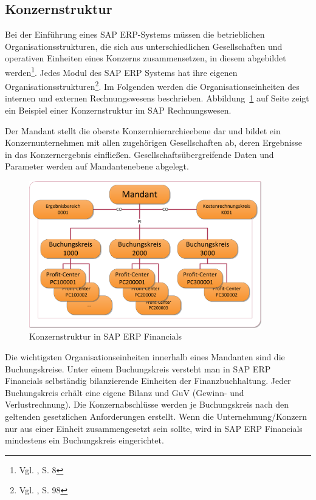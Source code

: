 \subsection{Konzernstruktur}
Bei der Einführung eines SAP ERP-Systems müssen die betrieblichen Organisationsstrukturen, die sich aus unterschiedlichen Gesellschaften und operativen Einheiten eines Konzerns zusammensetzen, in diesem abgebildet werden\footnote{Vgl. \cite{Jacob2008}, S. 8}.
Jedes Modul des SAP ERP Systems hat ihre eigenen Organisationsstrukturen\footnote{Vgl. \cite{Klein2010}, S. 98}. Im Folgenden werden die Organisationseinheiten des internen und externen Rechnungswesens beschrieben. Abbildung~\ref{abb2} auf Seite \pageref{abb2} zeigt ein Beispiel einer Konzernstruktur im SAP Rechnungswesen.

Der Mandant stellt die oberste Konzernhierarchieebene dar und bildet ein Konzernunternehmen mit allen zugehörigen Gesellschaften ab, deren Ergebnisse in das Konzernergebnis einfließen. Gesellschaftsübergreifende Daten und Parameter werden auf Mandantenebene abgelegt.
\begin{figure}[htbp]
\begin{center}
\includegraphics[width=0.9\textwidth]{Images/konzernStruktur.png}

   \caption[Konzernstruktur in SAP ERP Financials]{Konzernstruktur in SAP ERP Financials}\label{abb2}
\end{center}
\end{figure}\noindent
Die wichtigsten Organisationseinheiten innerhalb eines Mandanten sind die Buchungskreise. Unter einem Buchungskreis versteht man in SAP ERP Financials selbständig bilanzierende Einheiten der Finanzbuchhaltung. Jeder Buchungskreis erhält eine eigene Bilanz und GuV (Gewinn- und Verlustrechnung). Die Konzernabschlüsse werden je Buchungskreis nach den geltenden gesetzlichen Anforderungen erstellt. Wenn die Unternehmung/Konzern nur aus einer Einheit zusammengesetzt sein sollte, wird in SAP ERP Financials mindestens ein Buchungskreis eingerichtet.

